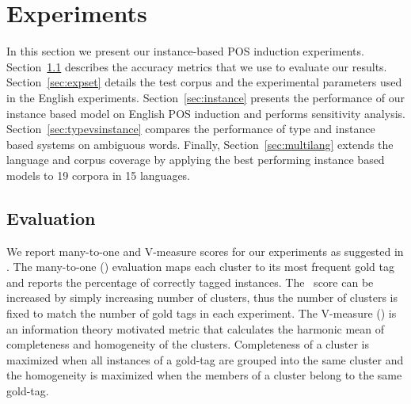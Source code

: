 \section{Experiments}
\label{sec:exp}

In this section we present our instance-based POS induction
experiments.  Section~\ref{sec:evaluation} describes the accuracy
metrics that we use to evaluate our results.  Section~\ref{sec:expset}
details the test corpus and the experimental parameters used in the
English experiments.  Section~\ref{sec:instance} presents the
performance of our instance based model on English POS induction and
performs sensitivity analysis.  Section~\ref{sec:typevsinstance}
compares the performance of type and instance based systems on
ambiguous words.  Finally, Section~\ref{sec:multilang} extends the
language and corpus coverage by applying the best performing instance
based models to 19 corpora in 15 languages.

\subsection{Evaluation}
\label{sec:evaluation}
We report many-to-one and V-measure scores for our experiments as
suggested in \cite{Christodoulopoulos:2010:TDU:1870658.1870714}.  The
many-to-one (\mto) evaluation maps each cluster to its most frequent
gold tag and reports the percentage of correctly tagged instances.
The \mto\ score can be increased by simply increasing number of
clusters, thus the number of clusters is fixed to match the number of
gold tags in each experiment.  The V-measure (\vm)
\cite{rosenberg2007v} is an information theory motivated metric that
calculates the harmonic mean of completeness and homogeneity of the
clusters.  Completeness of a cluster is maximized when all instances
of a gold-tag are grouped into the same cluster and the homogeneity is
maximized when the members of a cluster belong to the same gold-tag.

